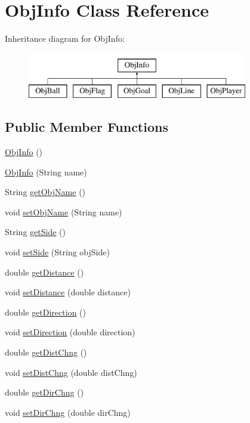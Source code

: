 \hypertarget{classObjInfo}{
\section{ObjInfo Class Reference}
\label{classObjInfo}
}
Inheritance diagram for ObjInfo:\begin{figure}[H]
\begin{center}
\leavevmode
\includegraphics[height=2.000000cm]{classObjInfo}
\end{center}
\end{figure}
\subsection*{Public Member Functions}
\begin{DoxyCompactItemize}
\item 
\hyperlink{classObjInfo_ad19b0055d176cde79b5378ccdc38df3a}{ObjInfo} ()
\item 
\hyperlink{classObjInfo_a142d8b8895338edfac87db81969476f9}{ObjInfo} (String name)
\item 
String \hyperlink{classObjInfo_ad44bdb3cd59a74e08070965324ac3683}{getObjName} ()
\item 
void \hyperlink{classObjInfo_af32b13fc26020d60369b17eb6b9a9965}{setObjName} (String name)
\item 
String \hyperlink{classObjInfo_a48ed0db963d2462969cd33af9dd28118}{getSide} ()
\item 
void \hyperlink{classObjInfo_a735e078adee364209387ce08416b705a}{setSide} (String objSide)
\item 
double \hyperlink{classObjInfo_a0d4c92ca74fba99b3e7f2640229eb2d1}{getDistance} ()
\item 
void \hyperlink{classObjInfo_a378cc32e9007aaf1c9ab692e126151bc}{setDistance} (double distance)
\item 
double \hyperlink{classObjInfo_acbe5646380c4bcd20ec6a8a23f515266}{getDirection} ()
\item 
void \hyperlink{classObjInfo_af032096b1e9b5c9ca2816d9f4ac0bdbb}{setDirection} (double direction)
\item 
double \hyperlink{classObjInfo_aaee814bd674ebe17d3889d356c5a1e69}{getDistChng} ()
\item 
void \hyperlink{classObjInfo_ad0571c0aa6bd8f5703ce030a250ea98c}{setDistChng} (double distChng)
\item 
double \hyperlink{classObjInfo_a015ed333d19893a3c81776f50eb17416}{getDirChng} ()
\item 
void \hyperlink{classObjInfo_ac562af4e289c8c552ee8c471f4b43094}{setDirChng} (double dirChng)
\end{DoxyCompactItemize}


